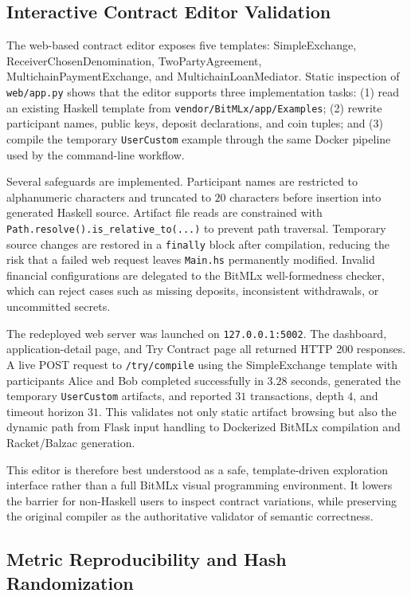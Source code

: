 \documentclass[journal]{IEEEtran}
\begin{document}
\subsection{Interactive Contract Editor Validation}

The web-based contract editor exposes five templates: SimpleExchange, ReceiverChosenDenomination, TwoPartyAgreement, MultichainPaymentExchange, and MultichainLoanMediator. Static inspection of \texttt{web/app.py} shows that the editor supports three implementation tasks: (1) read an existing Haskell template from \texttt{vendor/BitMLx/app/Examples}; (2) rewrite participant names, public keys, deposit declarations, and coin tuples; and (3) compile the temporary \texttt{UserCustom} example through the same Docker pipeline used by the command-line workflow.

Several safeguards are implemented. Participant names are restricted to alphanumeric characters and truncated to $20$ characters before insertion into generated Haskell source. Artifact file reads are constrained with \texttt{Path.resolve().is\_relative\_to(...)} to prevent path traversal. Temporary source changes are restored in a \texttt{finally} block after compilation, reducing the risk that a failed web request leaves \texttt{Main.hs} permanently modified. Invalid financial configurations are delegated to the BitMLx well-formedness checker, which can reject cases such as missing deposits, inconsistent withdrawals, or uncommitted secrets.

The redeployed web server was launched on \texttt{127.0.0.1:5002}. The dashboard, application-detail page, and Try Contract page all returned HTTP 200 responses. A live POST request to \texttt{/try/compile} using the SimpleExchange template with participants Alice and Bob completed successfully in $3.28$ seconds, generated the temporary \texttt{UserCustom} artifacts, and reported $31$ transactions, depth $4$, and timeout horizon $31$. This validates not only static artifact browsing but also the dynamic path from Flask input handling to Dockerized BitMLx compilation and Racket/Balzac generation.

This editor is therefore best understood as a safe, template-driven exploration interface rather than a full BitMLx visual programming environment. It lowers the barrier for non-Haskell users to inspect contract variations, while preserving the original compiler as the authoritative validator of semantic correctness.

\subsection{Metric Reproducibility and Hash Randomization}
\label{sec:reproducibility}
\end{document}

